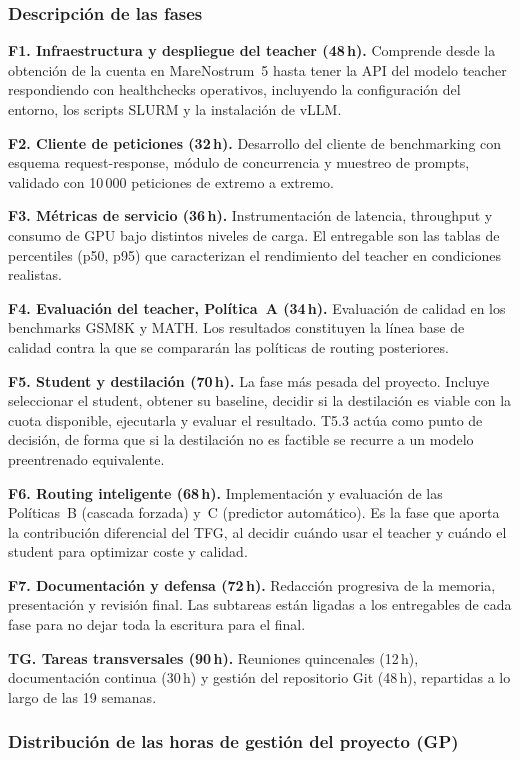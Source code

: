 \subsubsection{Descripción de las fases}

\textbf{F1. Infraestructura y despliegue del teacher (48\,h).} Comprende desde la obtención de la cuenta en MareNostrum~5 hasta tener la API del modelo teacher respondiendo con healthchecks operativos, incluyendo la configuración del entorno, los scripts SLURM y la instalación de vLLM.

\textbf{F2. Cliente de peticiones (32\,h).} Desarrollo del cliente de benchmarking con esquema request-response, módulo de concurrencia y muestreo de prompts, validado con 10\,000 peticiones de extremo a extremo.

\textbf{F3. Métricas de servicio (36\,h).} Instrumentación de latencia, throughput y consumo de GPU bajo distintos niveles de carga. El entregable son las tablas de percentiles (p50, p95) que caracterizan el rendimiento del teacher en condiciones realistas.

\textbf{F4. Evaluación del teacher, Política~A (34\,h).} Evaluación de calidad en los benchmarks GSM8K y MATH. Los resultados constituyen la línea base de calidad contra la que se compararán las políticas de routing posteriores.

\textbf{F5. Student y destilación (70\,h).} La fase más pesada del proyecto. Incluye seleccionar el student, obtener su baseline, decidir si la destilación es viable con la cuota disponible, ejecutarla y evaluar el resultado. T5.3 actúa como punto de decisión, de forma que si la destilación no es factible se recurre a un modelo preentrenado equivalente.

\textbf{F6. Routing inteligente (68\,h).} Implementación y evaluación de las Políticas~B (cascada forzada) y~C (predictor automático). Es la fase que aporta la contribución diferencial del TFG, al decidir cuándo usar el teacher y cuándo el student para optimizar coste y calidad.

\textbf{F7. Documentación y defensa (72\,h).} Redacción progresiva de la memoria, presentación y revisión final. Las subtareas están ligadas a los entregables de cada fase para no dejar toda la escritura para el final.

\textbf{TG. Tareas transversales (90\,h).} Reuniones quincenales (12\,h), documentación continua (30\,h) y gestión del repositorio Git (48\,h), repartidas a lo largo de las 19 semanas.

\subsubsection{Distribución de las horas de gestión del proyecto (GP)}

